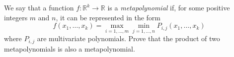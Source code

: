 We say that a function $f : \mathbb{R}^k \to \mathbb{R}$ is a \emph{metapolynomial} if, for some positive integers $m$ and $n$, it can be represented in the form
\[
f(x_1, \ldots, x_k) = \max_{i=1,\ldots,m} \min_{j=1,\ldots,n} P_{i,j}(x_1, \ldots, x_k)
\]
where $P_{i,j}$ are multivariate polynomials. Prove that the product of two metapolynomials is also a metapolynomial.
